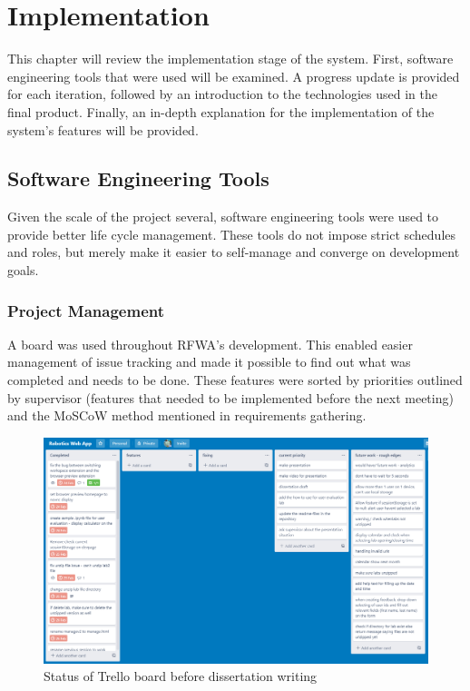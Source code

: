 \documentclass{l4proj}
\begin{document}
\chapter{Implementation}
This chapter will review the implementation stage of the system. First, software engineering
tools that were used will be examined. A progress update is provided for each iteration, followed by an introduction to the technologies used in the final product. Finally, an in-depth 
explanation for the implementation of the system's features will be provided.

\section{Software Engineering Tools}
Given the scale of the project several, software engineering tools were used to provide better life cycle management. These tools do not impose strict schedules and roles, but merely make it easier to self-manage and converge on development goals. 

\subsection{Project Management}

A \cite{Trello} board was used throughout RFWA's development. This enabled easier management of issue tracking and made it possible to find out what was completed and needs to be done. These features were sorted by priorities outlined by supervisor (features that needed to be implemented before the next meeting) and the MoSCoW method mentioned in requirements gathering.  

\begin{figure}[h]
    \centering
    \includegraphics[scale=0.33]{images/trello.png}
    \caption{Status of Trello board before dissertation writing}
    \label{fig:trello_board}
\end{figure}
\end{document}
